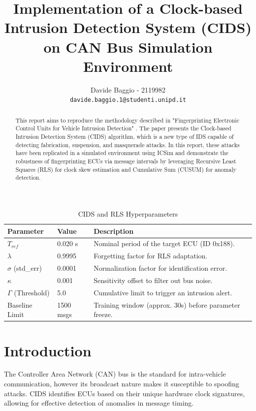 \documentclass[12pt,twocolumn,letterpaper]{article} %
\title{\Large \textbf{Implementation of a Clock-based Intrusion Detection System (CIDS) on CAN Bus Simulation Environment}}
\author{
    Davide Baggio - 2119982 \\ \texttt{davide.baggio.1@studenti.unipd.it}
}
\date{}
\begin{document}
\maketitle

\begin{abstract}
This report aims to reproduce the methodology described in "Fingerprinting Electronic Control Units for Vehicle Intrusion Detection" \cite{cho2016}. The paper presents the Clock-based Intrusion Detection System (CIDS) algorithm, which is a new type of IDS capable of detecting fabrication, suspension, and masquerade attacks. In this report, these attacks have been replicated in a simulated environment using ICSim and demonstrate the robustness of fingerprinting ECUs via message intervals by leveraging Recursive Least Squares (RLS) for clock skew estimation and Cumulative Sum (CUSUM) for anomaly detection.
\end{abstract}

\begin{table}[h]
\centering
\caption{CIDS and RLS Hyperparameters}
\label{tab:params}
\begin{tabular}{@{}lll@{}}
\toprule
\textbf{Parameter} & \textbf{Value} & \textbf{Description} \\ \midrule
$T_{ref}$          & 0.020 s        & Nominal period of the target ECU (ID 0x188). \\
$\lambda$          & 0.9995         & Forgetting factor for RLS adaptation. \\
$\sigma$ (std\_err)& 0.0001         & Normalization factor for identification error. \\
$\kappa$           & 0.001          & Sensitivity offset to filter out bus noise. \\
$\Gamma$ (Threshold)& 5.0           & Cumulative limit to trigger an intrusion alert. \\
Baseline Limit     & 1500 msgs      & Training window (approx. 30s) before parameter freeze. \\ \bottomrule
\end{tabular}
\end{table}

\section{Introduction}
The Controller Area Network (CAN) bus is the standard for intra-vehicle communication, however its broadcast nature makes it susceptible to spoofing attacks. CIDS identifies ECUs based on their unique hardware clock signatures, allowing for effective detection of anomalies in message timing.
\end{document}
